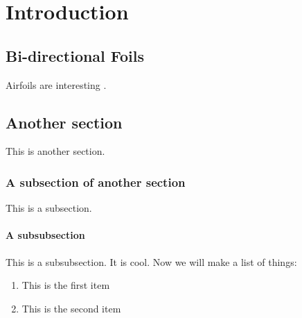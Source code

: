 \chapter{Introduction}

\section{Bi-directional Foils}

Airfoils are interesting \cite{Abbott1959}.



\section{Another section}
This is another section.


\subsection{A subsection of another section}

This is a subsection.


\subsubsection{A subsubsection}

This is a subsubsection. It is cool. Now we will make a list of things:

\begin{enumerate}
    \item This is the first item

    \item This is the second item
\end{enumerate}
